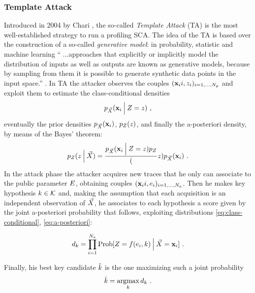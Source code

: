 \subsubsection{Template Attack}
Introduced in 2004 by Chari \cite{Chari2003}, the so-called \emph{Template Attack} (TA) is the most well-established strategy to run a profiling SCA. The idea of the TA is based over the construction of a so-called \emph{generative model}: in probability, statistic and machine learning \enquote{ ...approaches that explicitly or implicitly model the distribution of inputs as well as outputs are known as generative models, because by sampling from them it is possible to generate synthetic data points in the input space.} \cite{christopher2006pattern}.
In TA the attacker observes the couples $(\vLeakVec{i}, \sensVar_i)_{i=1, \dots , \nbProfilingTraces}$  and exploit them to estimate the class-conditional densities  
\begin{equation}\label{eq:class-conditional}
p_{\vaLeakVec}(\vLeakVec \given \sensRandVar = \sensVar)\mbox{ ,}
\end{equation}
eventually the prior densities $p_{\vaLeakVec}(\vLeakVec)$, $p_{\sensRandVar}(\sensVar)$, and finally the a-posteriori density, by means of the Bayes' theorem:
\begin{equation}\label{eq:a-posteriori}
p_{\sensRandVar}(\sensVar \given \vaLeakVec) = \frac{p_{\vaLeakVec}(\vLeakVec \given \sensRandVar = \sensVar)p_{\sensRandVar}}(\sensVar) {p_{\vaLeakVec}(\vLeakVec)}\mbox{ .}
\end{equation}
In the attack phase the attacker acquires new traces that he only can associate to the public parameter $\publicParRandVar$, obtaining couples  $(\vLeakVec{i}, \publicParVar_i)_{i=1, \dots , \nbAttackTraces}$. Then he makes key hypothesis $\keyVar \in \keyVarSet$ and, making the assumption that each acquisition is an independent observation of $\vaLeakVec$, he associates to each hypothesis a score given by the joint a-posteriori probability that follows, exploiting distributions \eqref{eq:class-conditional}, \eqref{eq:a-posteriori}:

\begin{equation}
d_{\keyVar} = \prod_{i=1}^{\nbAttackTraces}\prob[\sensRandVar = \sensFunction(\publicParVar_i,\keyVar) \given \vaLeakVec = \vLeakVec[i]] \mbox{ .}
\end{equation}

Finally, his best key candidate $\hat{\keyVar}$ is the one maximizing such a joint probability
\begin{equation}\label{eq:max_classifier}
\hat{\keyVar} = \argmax_{\keyVar} d_{\keyVar} \mbox{ .}
\end{equation}

